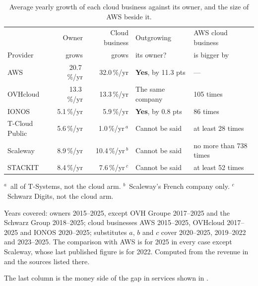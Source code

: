 \begin{table}[htbp]
  \centering
  \caption{Average yearly growth of each cloud business against its owner, and
           the size of \acs{AWS} beside it.}
  \label{tab:study3-growth}
  \footnotesize
  \setlength{\tabcolsep}{4pt}
  \begin{tabular}{@{}l r r l l@{}}
    \toprule
    & Owner & Cloud business & Outgrowing & \acs{AWS} cloud business \\
    Provider & grows & grows & its owner? & is bigger by \\
    \midrule
    \acs{AWS}      & 20.7\,\%/yr & 32.0\,\%/yr         & \textbf{Yes}, by 11.3 pts & --- \\
    OVHcloud       & 13.3\,\%/yr & 13.3\,\%/yr         & The same company          & 105 times \\
    IONOS          &  5.1\,\%/yr &  5.9\,\%/yr         & \textbf{Yes}, by 0.8 pts  & 86 times \\
    T-Cloud Public &  5.6\,\%/yr &  1.0\,\%/yr\,$^{a}$ & Cannot be said            & at least 28 times \\
    Scaleway       &  8.9\,\%/yr & 10.4\,\%/yr\,$^{b}$ & Cannot be said            & no more than 738 times \\
    STACKIT        &  8.4\,\%/yr &  7.6\,\%/yr\,$^{c}$ & Cannot be said            & at least 52 times \\
    \bottomrule
  \end{tabular}

  \vspace{4pt}
  {\footnotesize\raggedright
  $^{a}$~all of T-Systems, not the cloud arm. \quad
  $^{b}$~Scaleway's French company only. \quad
  $^{c}$~Schwarz Digits, not the cloud arm.\par
  \vspace{2pt}
  Years covered: owners 2015--2025, except OVH Groupe 2017--2025 and the Schwarz
  Group 2018--2025; cloud businesses \acs{AWS} 2015--2025, OVHcloud 2017--2025 and
  IONOS 2020--2025; substitutes $a$, $b$ and $c$ cover 2020--2025, 2019--2022 and
  2023--2025. The comparison with \acs{AWS} is for 2025 in every case except
  Scaleway, whose last published figure is for 2022. Computed from the revenue in
   and the sources listed there.\par}
\end{table}

The last column is the money side of the gap in services shown in
.

